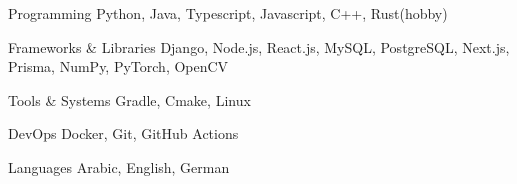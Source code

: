 

\begin{cvskills}

  \cvskill
  {Programming} %
  {Python, Java, Typescript, Javascript, C++, Rust(hobby)} %

  \cvskill
    {Frameworks \& Libraries} %
    {Django, Node.js, React.js, MySQL, PostgreSQL, Next.js, Prisma, NumPy, PyTorch, OpenCV} %

 
  \cvskill
  {Tools \& Systems} %
  {Gradle, Cmake, Linux} %


  \cvskill
    {DevOps} %
    {Docker, Git, GitHub Actions} %

  \cvskill
    {Languages} %
    {Arabic, English, German} %

\end{cvskills}

